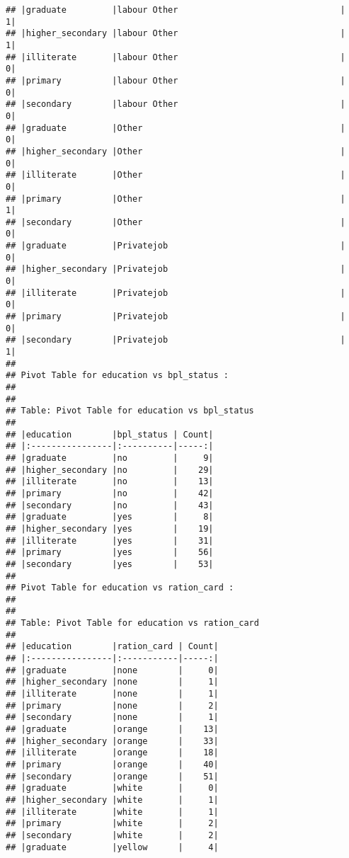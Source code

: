\documentclass[
]{article}
\begin{document}
\begin{verbatim}
## |graduate         |labour Other                                |     1|
## |higher_secondary |labour Other                                |     1|
## |illiterate       |labour Other                                |     0|
## |primary          |labour Other                                |     0|
## |secondary        |labour Other                                |     0|
## |graduate         |Other                                       |     0|
## |higher_secondary |Other                                       |     0|
## |illiterate       |Other                                       |     0|
## |primary          |Other                                       |     1|
## |secondary        |Other                                       |     0|
## |graduate         |Privatejob                                  |     0|
## |higher_secondary |Privatejob                                  |     0|
## |illiterate       |Privatejob                                  |     0|
## |primary          |Privatejob                                  |     0|
## |secondary        |Privatejob                                  |     1|
## 
## Pivot Table for education vs bpl_status :
## 
## 
## Table: Pivot Table for education vs bpl_status
## 
## |education        |bpl_status | Count|
## |:----------------|:----------|-----:|
## |graduate         |no         |     9|
## |higher_secondary |no         |    29|
## |illiterate       |no         |    13|
## |primary          |no         |    42|
## |secondary        |no         |    43|
## |graduate         |yes        |     8|
## |higher_secondary |yes        |    19|
## |illiterate       |yes        |    31|
## |primary          |yes        |    56|
## |secondary        |yes        |    53|
## 
## Pivot Table for education vs ration_card :
## 
## 
## Table: Pivot Table for education vs ration_card
## 
## |education        |ration_card | Count|
## |:----------------|:-----------|-----:|
## |graduate         |none        |     0|
## |higher_secondary |none        |     1|
## |illiterate       |none        |     1|
## |primary          |none        |     2|
## |secondary        |none        |     1|
## |graduate         |orange      |    13|
## |higher_secondary |orange      |    33|
## |illiterate       |orange      |    18|
## |primary          |orange      |    40|
## |secondary        |orange      |    51|
## |graduate         |white       |     0|
## |higher_secondary |white       |     1|
## |illiterate       |white       |     1|
## |primary          |white       |     2|
## |secondary        |white       |     2|
## |graduate         |yellow      |     4|

\end{verbatim}
\end{document}
